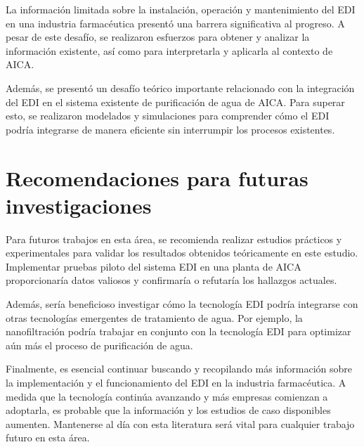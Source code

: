 La información limitada sobre la instalación, operación y mantenimiento del EDI
en una industria farmacéutica presentó una barrera significativa al progreso. A
pesar de este desafío, se realizaron esfuerzos para obtener y analizar la información
existente, así como para interpretarla y aplicarla al contexto de AICA.

Además, se presentó un desafío teórico importante relacionado con la integración
del EDI en el sistema existente de purificación de agua de AICA. Para superar esto,
se realizaron modelados y simulaciones para comprender cómo el EDI podría
integrarse de manera eficiente sin interrumpir los procesos existentes.

\section*{Recomendaciones para futuras investigaciones}


Para futuros trabajos en esta área, se recomienda realizar estudios prácticos y
experimentales para validar los resultados obtenidos teóricamente en este estudio.
Implementar pruebas piloto del sistema EDI en una planta de AICA proporcionaría
datos valiosos y confirmaría o refutaría los hallazgos actuales.

Además, sería beneficioso investigar cómo la tecnología EDI podría integrarse
con otras tecnologías emergentes de tratamiento de agua. Por ejemplo,
la nanofiltración podría
trabajar en conjunto con la tecnología EDI para optimizar aún más el
proceso de purificación de agua.

Finalmente, es esencial continuar buscando y recopilando más información
sobre la implementación y el funcionamiento del EDI en la industria farmacéutica.
A medida que la tecnología continúa avanzando y más empresas comienzan a adoptarla,
es probable que la información y los estudios de caso disponibles aumenten.
Mantenerse al día con esta literatura será vital para cualquier trabajo futuro en esta área.